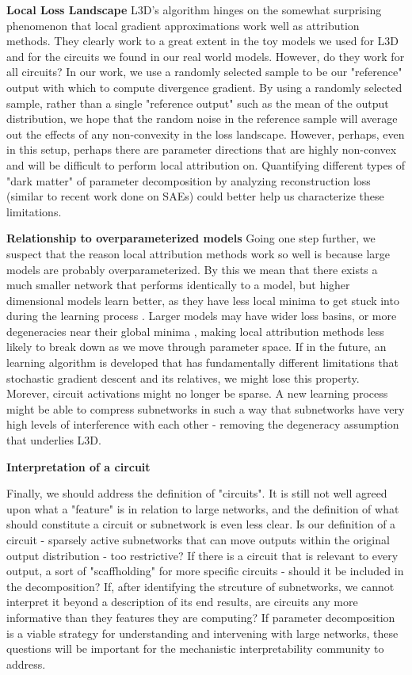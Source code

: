 \documentclass{article}
\theoremstyle{plain}
\theoremstyle{definition}
\theoremstyle{remark}
\begin{document}
\textbf{Local Loss Landscape}
L3D's algorithm hinges on the somewhat surprising phenomenon that local gradient approximations work well as attribution methods. They clearly work to a great extent in the toy models we used for L3D and for the circuits we found in our real world models. However, do they work for all circuits? In our work, we use a randomly selected sample to be our "reference" output with which to compute divergence gradient. By using a randomly selected sample, rather than a single "reference output" such as the mean of the output distribution, we hope that the random noise in the reference sample will average out the effects of any non-convexity in the loss landscape.  However, perhaps, even in this setup, perhaps there are parameter directions that are highly non-convex and will be difficult to perform local attribution on. Quantifying different types of "dark matter" of parameter decomposition by analyzing reconstruction loss (similar to recent work done on SAEs) could better help us characterize these limitations.

\textbf{Relationship to overparameterized models}
Going one step further, we suspect that the reason local attribution methods work so well is because large models are probably overparameterized. By this we mean that there exists a much smaller network that performs identically to a model, but higher dimensional models learn better, as they have less local minima to get stuck into during the learning process \cite{kawaguchi2016deep,choromanska2015loss,dauphin2014identifying,soudry2017exponentially}. Larger models may have wider loss basins, or more degeneracies near their global minima \cite{keskar2016large,sagun2017empirical}, making local attribution methods less likely to break down as we move through parameter space. If in the future, an learning algorithm is developed that has fundamentally different limitations that stochastic gradient descent and its relatives, we might lose this property. Morever, circuit activations might no longer be sparse. A new learning process might be able to compress subnetworks in such a way that subnetworks have very high levels of interference with each other - removing the degeneracy assumption that underlies L3D. 

\textbf{Interpretation of a circuit}

Finally, we should address the definition of "circuits". It is still not well agreed upon what a "feature" is in relation to large networks, and the definition of what should constitute a circuit or subnetwork is even less clear. Is our definition of a circuit - sparsely active subnetworks that can move outputs within the original output distribution - too restrictive? If there is a circuit that is relevant to every output, a sort of "scaffholding" for more specific circuits - should it be included in the decomposition? If, after identifying the strcuture of subnetworks, we cannot interpret it beyond a description of its end results, are circuits any more informative than they features they are computing? If parameter decomposition is a viable strategy for understanding and intervening with large networks, these questions will be important for the mechanistic interpretability community to address.
\end{document}
